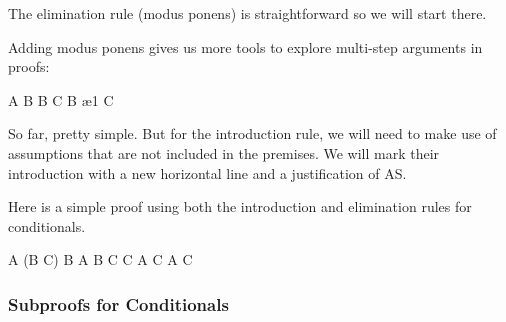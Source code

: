 The elimination rule (modus ponens) is straightforward so we will start there.

\begin{fitchrule}
  \label{def:if-elimination-rule}
  \leavevmode
  \vspace{-0.9\baselineskip}
  \begin{fitchproof}
     {\ephi\eif\epsi}
     {\ephi}
     {\epsi}           
  \end{fitchproof}
\end{fitchrule}

Adding modus ponens gives us more tools to explore multi-step arguments in
proofs:

\begin{fitchproof}
   {A \eand B} 
   {B \eif  C} 
   {B}         \ae{1}
   {C}         
\end{fitchproof}

So far, pretty simple. But for the introduction rule, we will need to make use
of assumptions that are not included in the premises. We will mark their
introduction with a new horizontal line and a justification of AS.

\begin{fitchrule}
  \label{def:if-introduction-rule}
  \leavevmode
  \vspace{-0.9\baselineskip}
  \begin{fitchproof}
    \open
     {\ephi}           
     {\epsi}
    \close
     {\ephi\eif\epsi}  
  \end{fitchproof}
\end{fitchrule}

Here is a simple proof using both the introduction and elimination rules for
conditionals.

\begin{fitchproof}
   {A \eif (B \eif C)} 
  \open
   {B}        
  \open
   {A}        
   {B \eif C} 
   {C}          
  \close
   {A \eif C} 
  \close
   {A \eif C} 
\end{fitchproof}

\subsubsection{Subproofs for Conditionals}

